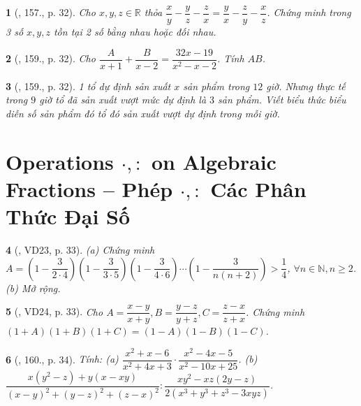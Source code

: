 \documentclass{article}
\newtheorem{baitoan}{}
\begin{document}
\begin{baitoan}[\cite{Tuyen_Toan_8}, 157., p. 32]
	Cho $x,y,z\in\mathbb{R}$ thỏa $\dfrac{x}{y} - \dfrac{y}{z} - \dfrac{z}{x} = \dfrac{y}{x} - \dfrac{z}{y} - \dfrac{x}{z}$. Chứng minh trong 3 số $x,y,z$ tồn tại 2 số bằng nhau hoặc đối nhau.
\end{baitoan}

\begin{baitoan}[\cite{Tuyen_Toan_8}, 159., p. 32]
	Cho $\dfrac{A}{x + 1} + \dfrac{B}{x - 2} = \dfrac{32x - 19}{x^2 - x - 2}$. Tính $AB$.
\end{baitoan}

\begin{baitoan}[\cite{Tuyen_Toan_8}, 159., p. 32]
	1 tổ dự định sản xuất $x$ sản phẩm trong $12$ giờ. Nhưng thực tế trong $9$ giờ tổ đã sản xuất vượt mức dự định là $3$ sản phẩm. Viết biểu thức biểu diễn số sản phẩm đó tổ đó sản xuất vượt dự định trong mỗi giờ.
\end{baitoan}


\section{Operations $\cdot,:$ on Algebraic Fractions -- Phép $\cdot,:$ Các Phân Thức Đại Số}

\begin{baitoan}[\cite{Tuyen_Toan_8}, VD23, p. 33]
	(a) Chứng minh $A = \left(1 - \dfrac{3}{2\cdot4}\right)\left(1 - \dfrac{3}{3\cdot5}\right)\left(1 - \dfrac{3}{4\cdot6}\right)\cdots\left(1 - \dfrac{3}{n(n + 2)}\right) > \dfrac{1}{4}$, $\forall n\in\mathbb{N},n\ge2$. (b) Mở rộng.
\end{baitoan}

\begin{baitoan}[\cite{Tuyen_Toan_8}, VD24, p. 33]
	Cho $A = \dfrac{x - y}{x + y},B = \dfrac{y - z}{y + z},C = \dfrac{z - x}{z + x}$. Chứng minh $(1 + A)(1 + B)(1 + C) = (1 - A)(1 - B)(1 - C)$.
\end{baitoan}

\begin{baitoan}[\cite{Tuyen_Toan_8}, 160., p. 34]
	Tính: (a) $\dfrac{x^2 + x - 6}{x^2 + 4x + 3}\cdot\dfrac{x^2 - 4x - 5}{x^2 - 10x + 25}$. (b) $\dfrac{x(y^2 - z) + y(x - xy)}{(x - y)^2 + (y - z)^2 + (z - x)^2}:\dfrac{xy^2 - xz(2y - z)}{2(x^3 + y^3 + z^3 - 3xyz)}$.
\end{baitoan}
\end{document}
